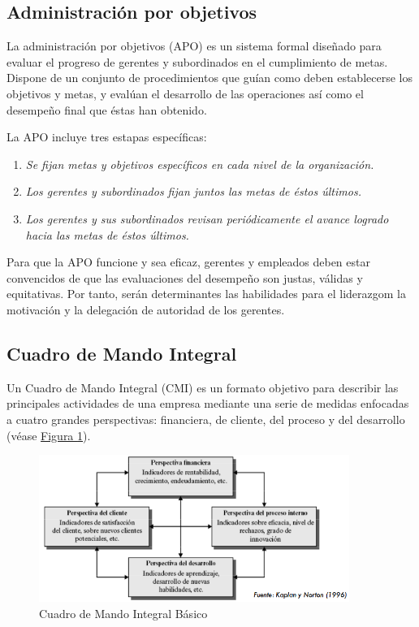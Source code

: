 \documentclass[12pt,a4paper,spanish]{report}
\begin{document}
		\subsection{\textcolor[rgb]{0.3,0.6,0.4}Administración por objetivos}
			La administración por objetivos (APO) es un sistema formal diseñado para evaluar el progreso de gerentes y subordinados en el cumplimiento de metas. Dispone de un conjunto de procedimientos que guían como deben establecerse los objetivos y metas, y evalúan el desarrollo de las operaciones así como el desempeño final que éstas han obtenido.

			La APO incluye tres estapas específicas:
			\begin{enumerate}[1.]
				\item \textcolor[rgb]{0.3,0.6,0.4}{\emph{Se fijan metas y objetivos específicos en cada nivel de la organización.}}
				\item \textcolor[rgb]{0.3,0.6,0.4}{\emph{Los gerentes y subordinados fijan juntos las metas de éstos últimos.}}
				\item \textcolor[rgb]{0.3,0.6,0.4}{\emph{Los gerentes y sus subordinados revisan periódicamente el avance logrado hacia las metas de éstos últimos.}}
			\end{enumerate}

			Para que la APO funcione y sea eficaz, gerentes y empleados deben estar convencidos de que las evaluaciones del desempeño son justas, válidas y equitativas. Por tanto, serán determinantes las habilidades para el liderazgom la motivación y la delegación de autoridad de los gerentes.

		\subsection{\textcolor[rgb]{0.3,0.6,0.4}Cuadro de Mando Integral}
			Un Cuadro de Mando Integral (CMI) es un formato objetivo para describir las principales actividades de una empresa mediante una serie de medidas enfocadas a cuatro grandes perspectivas: financiera, de cliente, del proceso y del desarrollo (véase \hyperref[mando_integral]{Figura \ref*{mando_integral}}).

			\begin{figure}
			 	\centering
			 		\includegraphics[width=0.9\textwidth]{8}
			 	\caption{Cuadro de Mando Integral Básico}
			 	\label{mando_integral}
			\end{figure}
\end{document}
